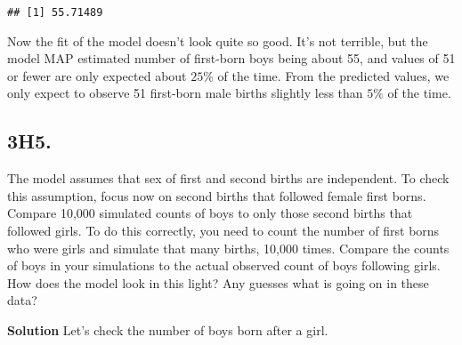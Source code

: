 \documentclass[
]{book}
\begin{document}
\begin{verbatim}
## [1] 55.71489
\end{verbatim}

Now the fit of the model doesn't look quite so good. It's not terrible, but the model MAP estimated number of first-born boys being about 55, and values of 51 or fewer are only expected about \(25\%\) of the time. From the predicted values, we only expect to observe 51 first-born male births slightly less than \(5\%\) of the time.

\hypertarget{h5.}{%
\subsection{3H5.}\label{h5.}}

The model assumes that sex of first and second births are independent. To check this assumption, focus now on second births that followed female first borns. Compare 10,000 simulated counts of boys to only those second births that followed girls. To do this correctly, you need to count the number of first borns who were girls and simulate that many births, 10,000 times. Compare the counts of boys in your simulations to the actual observed count of boys following girls. How does the model look in this light? Any guesses what is going on in these data?

\textbf{Solution}
Let's check the number of boys born after a girl.
\end{document}

